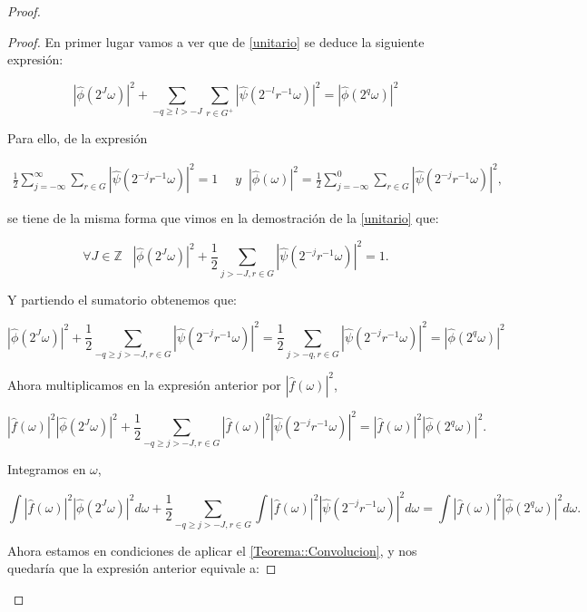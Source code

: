 \begin{proof}
\begin{proof}
  \noindent En primer lugar vamos a ver que de \autoref{unitario} se deduce la siguiente expresión: 

  $$|\widehat{\phi}(2^J \omega)|^2 + \sum_{-q\geq l > -J} \sum_{r \in G^+}|\widehat{\psi}(2^{-l}r^{-1} \omega)|^2=|\widehat{\phi}(2^q \omega) |^2$$

  \noindent Para ello, de la expresión

  \begin{align*}
    \frac{1}{2} \sum_{j=-\infty}^\infty \sum_{r \in G} |\widehat{\psi}(2^{-j}r^{-1}\omega)|^2=1 & \; \; y
    \;\;|\widehat{\phi}(\omega)|^2= \frac{1}{2} \sum_{j=-\infty}^0 \sum_{r\in G} |\widehat{\psi}(2^{-j}r^{-1}\omega)|^2,
  \end{align*}

  \noindent se tiene de la misma forma que vimos en la demostración de la \autoref{unitario} que:

  $$\forall J \in \mathbb{Z} \; \; \; \left|\widehat{\phi}\left(2^J\omega\right)\right|^2 + \frac{1}{2} \sum_{j>-J,r\in G}\left|\widehat{\psi}\left(2^{-j}r^{-1}\omega\right)\right|^2=1. $$

  \noindent Y partiendo el sumatorio obtenemos que: 

  $$\left|\widehat{\phi}\left(2^J\omega\right)\right|^2 + \frac{1}{2}  \sum_{-q \geq j >-J,r \in G}\left|\widehat{\psi}\left(2^{-j}r^{-1}\omega\right)\right|^2= \frac{1}{2} \sum_{j>-q,r \in G}\left|\widehat{\psi}\left(2^{-j}r^{-1}\omega\right)\right|^2=|\widehat{\phi}(2^q \omega)|^2$$
  
  \noindent Ahora multiplicamos en la expresión anterior por $|\widehat{f}(\omega)|^2$, 
  
  $$\left|\widehat{f}(\omega)\right|^2 \left|\widehat{\phi}\left(2^J\omega\right)\right|^2 + \frac{1}{2} \sum_{-q \geq j >-J,r \in G} \left|\widehat{f}(\omega)\right|^2 \left|\widehat{\psi}\left(2^{-j}r^{-1}\omega\right)\right|^2=\left|\widehat{f}(\omega)\right|^2 \left|\widehat{\phi}(2^q \omega)\right|^2.$$

  \noindent Integramos en $\omega$, 

  $$\int \left|\widehat{f}(\omega)\right|^2 \left|\widehat{\phi}\left(2^J\omega\right)\right|^2 d\omega + \frac{1}{2} \sum_{-q \geq j >-J,r \in G} \int \left|\widehat{f}(\omega)\right|^2 \left|\widehat{\psi}\left(2^{-j}r^{-1}\omega\right)\right|^2 d\omega=\int \left|\widehat{f}(\omega)\right|^2 \left|\widehat{\phi}(2^q \omega)\right|^2 d\omega.$$

  \noindent Ahora estamos en condiciones de aplicar el \autoref{Teorema::Convolucion}, y nos quedaría que la expresión anterior equivale a: 


\end{proof}
\end{proof}
